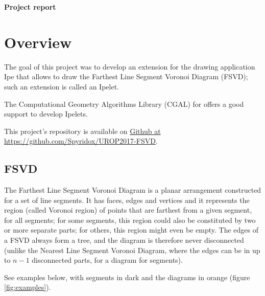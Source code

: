 \documentclass[11pt,a4paper,english]{article}
\begin{document}
    {\centering\huge\textbf{Project report}\par}

    \vspace{1cm}
    
    \section{Overview}
	
	The goal of this project was to develop an extension for the drawing application Ipe that allows to draw the Farthest Line Segment Voronoi Diagram (FSVD); such an extension is called an Ipelet.\par
	The Computational Geometry Algorithms Library (CGAL) for  offers a good support to develop Ipelets.\par
	This project's repository is available on \href{https://github.com/Spyridox/UROP2017-FSVD}{Github at https://github.com/Spyridox/UROP2017-FSVD}.
	
	\subsection{FSVD}
	
	The Farthest Line Segment Voronoi Diagram is a planar arrangement  constructed for a set of line segments. It has faces, edges and vertices and it represents the region (called Voronoi region) of points that are farthest from a given segment, for all segments; for some segments, this region could also be constituted by two or more separate parts; for others, this region might even	 be empty. The edges of a FSVD always form a tree, and the diagram is therefore never disconnected (unlike the Nearest Line Segment Voronoi Diagram, where the edges can be in up to \(n -1\) disconnected parts, for a diagram for \n segments).\par
	See examples below, with segments in dark and the diagrams in orange (figure \ref{fig:examples}).
	
\end{document}
